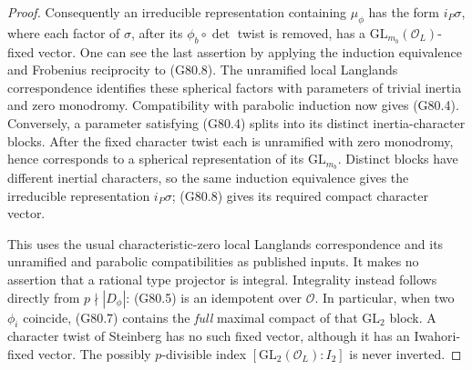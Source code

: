 \begin{proof}
Consequently an irreducible representation containing \(\mu_\phi\)
has the form \(i_P\sigma\), where each factor of \(\sigma\), after its
\(\phi_b\circ\det\) twist is removed, has a
\(\mathrm{GL}_{m_b}(\mathcal O_L)\)-fixed vector.
One can see the last assertion by applying the induction equivalence
and Frobenius reciprocity to (G80.8).
The unramified local Langlands correspondence identifies these spherical
factors with parameters of trivial inertia and zero monodromy.
Compatibility with parabolic induction now gives (G80.4).
Conversely, a parameter satisfying (G80.4) splits into its distinct
inertia-character blocks.  After the fixed character twist each is
unramified with zero monodromy, hence corresponds to a spherical
representation of its \(\mathrm{GL}_{m_b}\).  Distinct blocks have
different inertial characters, so the same induction equivalence gives
the irreducible representation \(i_P\sigma\); (G80.8) gives its required
compact character vector.

This uses the usual characteristic-zero local Langlands correspondence
and its unramified and parabolic compatibilities as published inputs.
It makes no assertion that a rational type projector is integral.
Integrality instead follows directly from
\(p\nmid|D_\phi|\): (G80.5) is an idempotent over \(\mathcal O\).
In particular, when two \(\phi_i\) coincide, (G80.7) contains the
\emph{full} maximal compact of that \(\mathrm{GL}_2\) block.
A character twist of Steinberg has no such fixed vector, although it has
an Iwahori-fixed vector.  The possibly \(p\)-divisible index
\([\mathrm{GL}_2(\mathcal O_L):I_2]\) is never inverted.
\end{proof}

